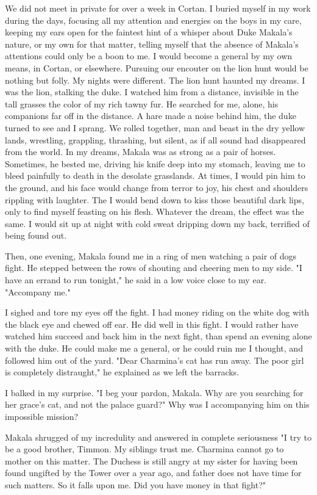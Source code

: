 \documentclass{article}
\begin{document}
We did not meet in private for over a week in Cortan. I buried myself in my work during the days, focusing all my attention and energies on the boys in my care, keeping my ears open for the faintest hint of a whisper about Duke Makala's nature, or my own for that matter, telling myself that the absence of Makala's attentions could only be a boon to me. I would become a general by my own means, in Cortan, or elsewhere. Pursuing our encouter on the lion hunt would be nothing but folly. My nights were different. The lion hunt haunted my dreams. I was the lion, stalking the duke. I watched him from a distance, invisible in the tall grasses the color of my rich tawny fur. He searched for me, alone, his companions far off in the distance. A hare made a noise behind him, the duke turned to see and I sprang. We rolled together, man and beast in the dry yellow lands, wrestling, grappling, thrashing, but silent, as if all sound had disappeared from the world. In my dreams, Makala was as strong as a pair of horses. Sometimes, he bested me, driving his knife deep into my stomach, leaving me to bleed painfully to death in the desolate grasslands. At times, I would pin him to the ground, and his face would change from terror to joy, his chest and shoulders rippling with laughter. The I would bend down to kiss those beautiful dark lips, only to find myself feasting on his flesh. Whatever the dream, the effect was the same. I would sit up at night with cold sweat dripping down my back, terrified of being found out. 

Then, one evening, Makala found me in a ring of men watching a pair of dogs fight. He stepped between the rows of shouting and cheering men to my side. "I have an errand to run tonight," he said in a low voice close to my ear. "Accompany me."

I sighed and tore my eyes off the fight. I had money riding on the white dog with the black eye and chewed off ear. He did well in this fight. I would rather have watched him succeed and back him in the next fight, than spend an evening alone with the duke.  He could make me a general, or he could ruin me I thought, and followed him out of the yard. "Dear Charmina's cat has run away. The poor girl is completely distraught," he explained as we left the barracks.

I balked in my surprise. "I beg your pardon, Makala. Why are you searching for her grace's cat, and not the palace guard?" Why was I accompanying him on this impossible mission?

Makala shrugged of my incredulity and answered in complete seriousness "I try to be a good brother, Timmon. My siblings trust me. Charmina cannot go to mother on this matter. The Duchess is still angry at my sister for having been found ungifted by the Tower over a year ago, and father does not have time for such matters. So it falls upon me. Did you have money in that fight?"
\end{document}
